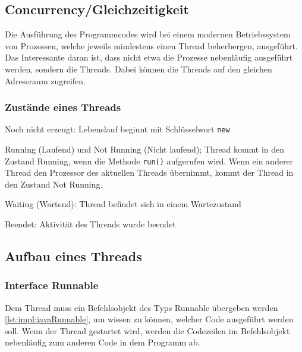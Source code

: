  
\subsection{Concurrency/Gleichzeitigkeit}
Die Ausführung des Programmcodes wird bei einem modernen Betriebssystem von Prozessen, welche jeweils mindestens einen Thread beherbergen, ausgeführt. Das Interessante daran ist, dass nicht etwa die Prozesse nebenläufig ausgeführt werden, sondern die Threads. Dabei können die Threads auf den gleichen Adressraum zugreifen.
 
\subsubsection{Zustände eines Threads}
\begin{compactitem}
    \item Noch nicht erzeugt: Lebenslauf beginnt mit Schlüsselwort \texttt{new}
    \item Running (Laufend) und Not Running (Nicht laufend); Thread kommt in den Zustand Running, wenn die Methode \texttt{run()} aufgerufen wird. Wenn ein anderer Thread den Prozessor des aktuellen Threads übernimmt, kommt der Thread in den Zustand Not Running.    
    \item Waiting (Wartend): Thread befindet sich in einem Wartezustand
    \item Beendet: Aktivität des Threads wurde beendet
\end{compactitem}
 
\subsection{Aufbau eines Threads}
\subsubsection{Interface Runnable}
Dem Thread muss ein Befehlsobjekt des Typs Runnable übergeben werden \ref{lst:impl:javaRunnable}, um wissen zu können, welcher Code ausgeführt werden soll.
Wenn der Thread gestartet wird, werden die Codezeilen im Befehlsobjekt nebenläufig zum anderen Code in dem Programm ab.
 
